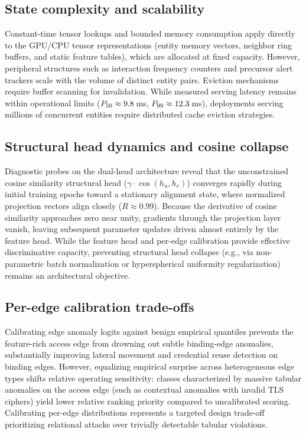 \subsection{State complexity and scalability}
\label{sec:limits-state}

Constant-time tensor lookups and bounded memory consumption apply directly to the GPU/CPU
tensor representations (entity memory vectors, neighbor ring buffers, and static feature tables),
which are allocated at fixed capacity. However, peripheral structures such as interaction frequency
counters and precursor alert trackers scale with the volume of distinct entity pairs. Eviction
mechanisms require buffer scanning for invalidation. While measured serving latency remains within
operational limits ($P_{50} \approx 9.8$\,ms, $P_{99} \approx 12.3$\,ms),
deployments serving millions of concurrent entities require distributed cache eviction strategies.

\subsection{Structural head dynamics and cosine collapse}
\label{sec:limits-struct}

Diagnostic probes on the dual-head architecture reveal that the unconstrained cosine similarity
structural head ($\gamma \cdot \cos(h_u, h_v)$) converges rapidly during initial training epochs
toward a stationary alignment state, where normalized projection vectors align closely ($R \approx 0.99$).
Because the derivative of cosine similarity approaches zero near unity, gradients through the
projection layer vanish, leaving subsequent parameter updates driven almost entirely by the feature
head. While the feature head and per-edge calibration provide effective discriminative capacity,
preventing structural head collapse (e.g., via non-parametric batch normalization or hyperspherical
uniformity regularization) remains an architectural objective.

\subsection{Per-edge calibration trade-offs}

Calibrating edge anomaly logits against benign empirical quantiles prevents the feature-rich access
edge from drowning out subtle binding-edge anomalies, substantially improving lateral movement and
credential reuse detection on binding edges. However, equalizing empirical surprise across heterogeneous
edge types shifts relative operating sensitivity: classes characterized by massive tabular anomalies on
the access edge (such as contextual anomalies with invalid TLS ciphers) yield lower relative ranking
priority compared to uncalibrated scoring. Calibrating per-edge distributions represents a targeted
design trade-off prioritizing relational attacks over trivially detectable tabular violations.


